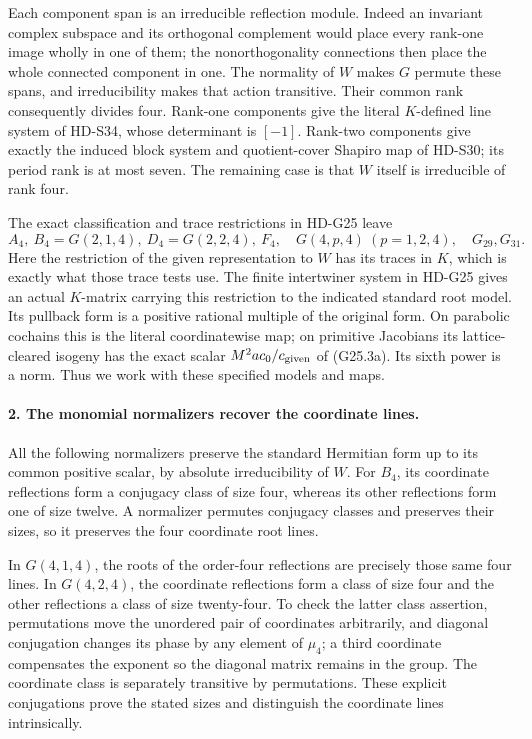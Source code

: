 Each component span is an irreducible reflection module. Indeed an
invariant complex subspace and its orthogonal complement would place
every rank-one image wholly in one of them; the nonorthogonality
connections then place the whole connected component in one. The
normality of \(W\) makes \(G\) permute these spans, and irreducibility
makes that action transitive. Their common rank consequently divides
four. Rank-one components give the literal \(K\)-defined line system
of HD-S34, whose determinant is \([-1]\). Rank-two components give
exactly the induced block system and quotient-cover Shapiro map of
HD-S30; its period rank is at most seven. The remaining case is that
\(W\) itself is irreducible of rank four.

The exact classification and trace restrictions in HD-G25 leave
\[
 A_4,\ B_4=G(2,1,4),\ D_4=G(2,2,4),\ F_4,
 \quad G(4,p,4)\ (p=1,2,4),\quad G_{29},G_{31}.             \tag{S35.2}
\]
Here the restriction of the given representation to \(W\) has its
traces in \(K\), which is exactly what those trace tests use.
The finite intertwiner system in HD-G25 gives an actual \(K\)-matrix
carrying this restriction to the indicated standard root model.
Its pullback form is a positive rational multiple of the original
form. On parabolic cochains this is the literal coordinatewise map;
on primitive Jacobians its lattice-cleared isogeny has the exact
scalar \(M^2a c_0/c_{\rm given}\) of (G25.3a). Its sixth power
is a norm. Thus we work with these specified models and maps.

\paragraph{2. The monomial normalizers recover the coordinate lines.}
All the following normalizers preserve the standard Hermitian form
up to its common positive scalar, by absolute irreducibility of \(W\).
For \(B_4\), its coordinate reflections form a conjugacy class of
size four, whereas its other reflections form one of size twelve.
A normalizer permutes conjugacy classes and preserves their sizes,
so it preserves the four coordinate root lines.

In \(G(4,1,4)\), the roots of the order-four reflections are precisely
those same four lines. In \(G(4,2,4)\), the coordinate reflections
form a class of size four and the other reflections a class of size
twenty-four. To check the latter class assertion, permutations move
the unordered pair of coordinates arbitrarily, and diagonal conjugation
changes its phase by any element of \(\mu_4\); a third coordinate
compensates the exponent so the diagonal matrix remains in the group.
The coordinate class is separately transitive by permutations.
These explicit conjugations prove the stated sizes and distinguish
the coordinate lines intrinsically.

